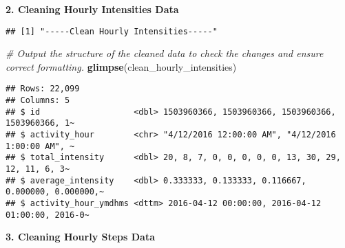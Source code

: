 \documentclass[
]{article}
\newenvironment{Shaded}{\begin{snugshade}}{\end{snugshade}}
\newcommand{\AttributeTok}[1]{\textcolor[rgb]{0.13,0.29,0.53}{#1}}
\newcommand{\CommentTok}[1]{\textcolor[rgb]{0.56,0.35,0.01}{\textit{#1}}}
\newcommand{\FunctionTok}[1]{\textcolor[rgb]{0.13,0.29,0.53}{\textbf{#1}}}
\newcommand{\NormalTok}[1]{#1}
\newcommand{\OtherTok}[1]{\textcolor[rgb]{0.56,0.35,0.01}{#1}}
\newcommand{\SpecialCharTok}[1]{\textcolor[rgb]{0.81,0.36,0.00}{\textbf{#1}}}
\newcommand{\StringTok}[1]{\textcolor[rgb]{0.31,0.60,0.02}{#1}}
\begin{document}
\textbf{2. Cleaning Hourly Intensities Data}

\begin{Shaded}
\end{Shaded}

\begin{verbatim}
## [1] "-----Clean Hourly Intensities-----"
\end{verbatim}

\begin{Shaded}
\begin{Highlighting}[]
\CommentTok{\# Output the structure of the cleaned data to check the changes and ensure correct formatting.}
\FunctionTok{glimpse}\NormalTok{(clean\_hourly\_intensities)}
\end{Highlighting}
\end{Shaded}

\begin{verbatim}
## Rows: 22,099
## Columns: 5
## $ id                   <dbl> 1503960366, 1503960366, 1503960366, 1503960366, 1~
## $ activity_hour        <chr> "4/12/2016 12:00:00 AM", "4/12/2016 1:00:00 AM", ~
## $ total_intensity      <dbl> 20, 8, 7, 0, 0, 0, 0, 0, 13, 30, 29, 12, 11, 6, 3~
## $ average_intensity    <dbl> 0.333333, 0.133333, 0.116667, 0.000000, 0.000000,~
## $ activity_hour_ymdhms <dttm> 2016-04-12 00:00:00, 2016-04-12 01:00:00, 2016-0~
\end{verbatim}

\textbf{3. Cleaning Hourly Steps Data}
\end{document}
